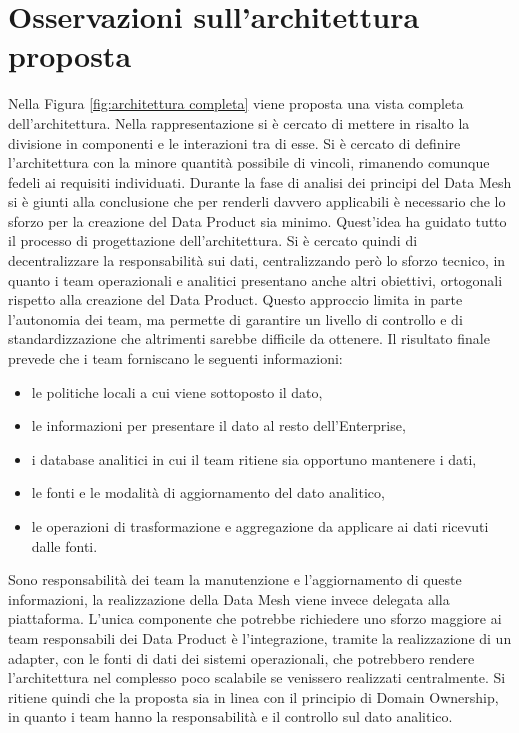 \documentclass[12pt]{report}
\begin{document}
\section{Osservazioni sull'architettura proposta}
Nella Figura \ref{fig:architettura completa} viene proposta una vista completa dell'architettura.
Nella rappresentazione si è cercato di mettere in risalto la divisione in componenti e le interazioni tra di esse.
Si è cercato di definire l'architettura con la minore quantità possibile di vincoli, rimanendo comunque fedeli ai requisiti individuati.
Durante la fase di analisi dei principi del Data Mesh si è giunti alla conclusione che per renderli davvero applicabili è necessario che lo sforzo per la creazione del Data Product sia minimo.
Quest'idea ha guidato tutto il processo di progettazione dell'architettura.
Si è cercato quindi di decentralizzare la responsabilità sui dati, centralizzando però lo sforzo tecnico, in quanto i team operazionali e analitici presentano anche altri obiettivi, ortogonali rispetto alla creazione del Data Product.
Questo approccio limita in parte l'autonomia dei team, ma permette di garantire un livello di controllo e di standardizzazione che altrimenti sarebbe difficile da ottenere.
Il risultato finale prevede che i team forniscano le seguenti informazioni:
\begin{itemize}
    \item le politiche locali a cui viene sottoposto il dato,
    \item le informazioni per presentare il dato al resto dell'Enterprise,
    \item i database analitici in cui il team ritiene sia opportuno mantenere i dati,
    \item le fonti e le modalità di aggiornamento del dato analitico,
    \item le operazioni di trasformazione e aggregazione da applicare ai dati ricevuti dalle fonti.
\end{itemize}
Sono responsabilità dei team la manutenzione e l'aggiornamento di queste informazioni, la realizzazione della Data Mesh viene invece delegata alla piattaforma.
L'unica componente che potrebbe richiedere uno sforzo maggiore ai team responsabili dei Data Product è l'integrazione, tramite la realizzazione di un adapter, con le fonti di dati dei sistemi operazionali, che potrebbero rendere l'architettura nel complesso poco scalabile se venissero realizzati centralmente.
Si ritiene quindi che la proposta sia in linea con il principio di Domain Ownership, in quanto i team hanno la responsabilità  e il controllo sul dato analitico.
\end{document}
